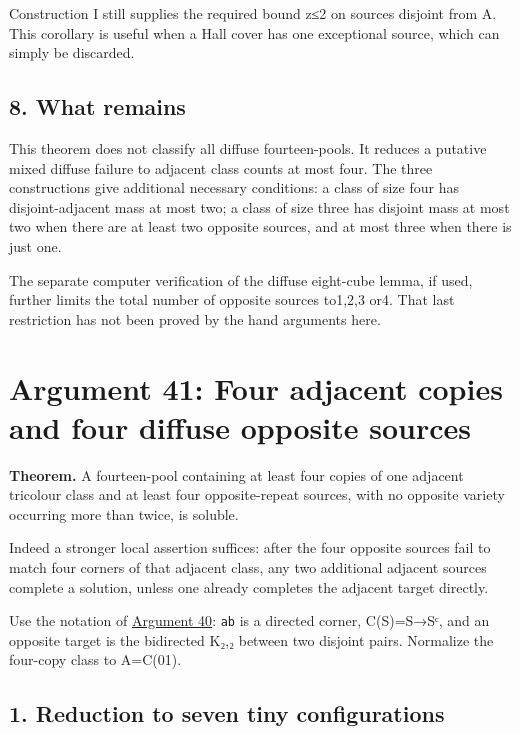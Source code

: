 \documentclass[
  10pt,
]{article}
\begin{document}
Construction I still supplies the required bound z≤2 on sources disjoint
from A. This corollary is useful when a Hall cover has one exceptional
source, which can simply be discarded.

\hypertarget{what-remains}{%
\subsection*{8. What remains}\label{what-remains}}

This theorem does not classify all diffuse fourteen-pools. It reduces a
putative mixed diffuse failure to adjacent class counts at most four.
The three constructions give additional necessary conditions: a class of
size four has disjoint-adjacent mass at most two; a class of size three
has disjoint mass at most two when there are at least two opposite
sources, and at most three when there is just one.

The separate computer verification of the diffuse eight-cube lemma, if
used, further limits the total number of opposite sources to1,2,3 or4.
That last restriction has not been proved by the hand arguments here.

\hypertarget{arg-41}{%
\section{Argument 41: Four adjacent copies and four diffuse opposite
sources}\label{arg-41}}

\textbf{Theorem.} A fourteen-pool containing at least four copies of one
adjacent tricolour class and at least four opposite-repeat sources, with
no opposite variety occurring more than twice, is soluble.

Indeed a stronger local assertion suffices: after the four opposite
sources fail to match four corners of that adjacent class, any two
additional adjacent sources complete a solution, unless one already
completes the adjacent target directly.

Use the notation of \protect\hyperlink{arg-40}{Argument 40}: \texttt{ab}
is a directed corner, C(S)=S→Sᶜ, and an opposite target is the
bidirected K₂,₂ between two disjoint pairs. Normalize the four-copy
class to A=C(01).

\hypertarget{reduction-to-seven-tiny-configurations}{%
\subsection*{1. Reduction to seven tiny
configurations}\label{reduction-to-seven-tiny-configurations}}
\end{document}
